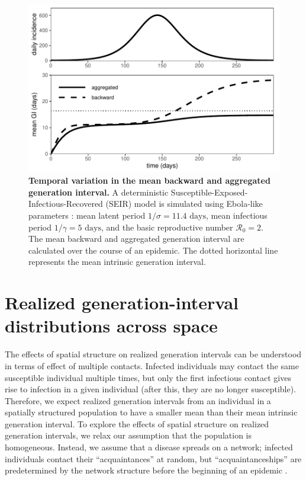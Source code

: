\documentclass[12pt]{article}
\newcommand{\RR}{\ensuremath{{\mathcal R}}}
\begin{document}
\begin{figure}[!ht]
\includegraphics[width=\textwidth]{temporal_effect.pdf}
\caption{\textbf{Temporal variation in the mean backward and aggregated generation interval.}
A deterministic Susceptible-Exposed-Infectious-Recovered (SEIR) model is simulated using Ebola-like parameters \citep{who2014ebola}: mean latent period $1/\sigma = 11.4 \textrm{ days}$, mean infectious period $1/\gamma = 5 \textrm{ days}$, and the basic reproductive number $\RR_0 = 2$. 
The mean backward and aggregated generation interval are calculated over the course of an epidemic.
The dotted horizontal line represents the mean intrinsic generation interval.
}
\label{fig:censor}
\end{figure}

\section{Realized generation-interval distributions across space}

The effects of spatial structure on realized generation intervals can be understood in terms of effect of multiple contacts.
Infected individuals may contact the same susceptible individual multiple times, but only the first infectious contact gives rise to infection in a given individual (after this, they are no longer susceptible).
Therefore, we expect realized generation intervals from an individual in a spatially structured population to have a smaller mean than their mean intrinsic generation interval.
To explore the effects of spatial structure on realized generation intervals, we relax our assumption that the population is homogeneous.
Instead, we assume that a disease spreads on a network;
infected individuals contact their ``acquaintances'' at random, but ``acquaintanceships'' are predetermined by the network structure before the beginning of an epidemic \cite{trapman2016inferring}.
\end{document}

